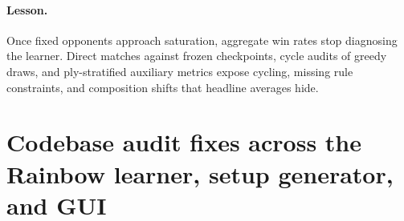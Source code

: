 \paragraph{Lesson.} Once fixed opponents approach saturation, aggregate win rates stop diagnosing
the learner. Direct matches against frozen checkpoints, cycle audits of greedy draws, and
ply-stratified auxiliary metrics expose cycling, missing rule constraints, and composition shifts
that headline averages hide.

\section{Codebase audit fixes across the Rainbow learner, setup generator, and GUI}
\label{sec:audit-fixes}

